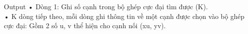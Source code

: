 Output
• Dòng 1: Ghi số cạnh trong bộ ghép cực đại tìm được (K).   
\\   • K dòng tiếp theo, mỗi dòng ghi thông tin về một cạnh được chọn vào bộ ghép cực đại: Gồm 2 số u, v thể hiện cho cạnh nối (xu, yv).